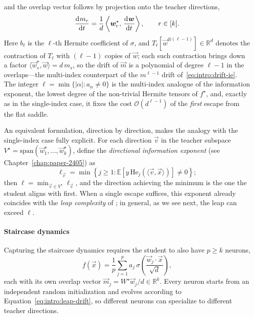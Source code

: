 and the overlap vector follows by projection onto the teacher directions,
\begin{equation}
    \label{eq:intro:leap-drift-overlap}
    \dod{m_r}{t} = \frac{1}{d}\left\langle \vec{w}^\star_r,\, \dod{\vec{w}}{t} \right\rangle, \qquad r \in [k].
\end{equation}
Here \(b_\ell\) is the \(\ell\)-th Hermite coefficient of \(\sigma\), and \(T_\ell[\vec{w}^{\otimes(\ell-1)}] \in \mathbb{R}^d\) denotes the contraction of \(T_\ell\) with \((\ell-1)\) copies of \(\vec{w}\); each such contraction brings down a factor \(\langle \vec{w}^\star_s, \vec{w}\rangle = d\,m_s\), so the drift of \(\vec{m}\) is a polynomial of degree \(\ell-1\) in the overlaps---the multi-index counterpart of the \(m^{\ell-1}\) drift of~\eqref{eq:intro:drift-ie}. The integer \(\ell = \min\{|\alpha| : a_\alpha \neq 0\}\) is the multi-index analogue of the information exponent, the lowest degree of the non-trivial Hermite tensors of \(f^\star\), and, exactly as in the single-index case, it fixes the cost \(\mathcal{O}(d^{\ell-1})\) of the \emph{first} escape from the flat saddle.

An equivalent formulation, direction by direction, makes the analogy with the single-index case fully explicit. For each direction \(\vec{v}\) in the teacher subspace \(V^\star = \mathrm{span}(\vec{w}^\star_1,\ldots,\vec{w}^\star_k)\), define the \emph{directional information exponent} (see Chapter~\ref{chap:paper-2405}) as
\begin{equation}
    \label{eq:intro:dir-info-exponent}
    \ell_{\vec{v}} = \min\!\left\{j \geq 1 : \mathbb{E}\!\left[y\,\mathrm{He}_j\!\left(\langle \vec{v}, \vec{x}\rangle\right)\right] \neq 0\right\};
\end{equation}
then \(\ell = \min_{\vec{v} \in V^\star} \ell_{\vec{v}}\), and the direction achieving the minimum is the one the student aligns with first. When a single escape suffices, this exponent already coincides with the \emph{leap complexity} of \citet{abbe2022merged, abbe2023sgd}; in general, as we see next, the leap can exceed \(\ell\).

\paragraph{Staircase dynamics} Capturing the staircase dynamics requires the student to also have \(p \geq k\) neurons,
\begin{equation}
    \label{eq:intro:multi-neuron-student}
    f(\vec{x}) = \frac{1}{p}\sum_{j=1}^p a_j\,\sigma\!\left(\frac{\vec{w}_j \cdot \vec{x}}{\sqrt{d}}\right),
\end{equation}
each with its own overlap vector \(\vec{m}_j = W^\star\vec{w}_j/d \in \mathbb{R}^k\). Every neuron starts from an independent random initialization and evolves according to Equation~\eqref{eq:intro:leap-drift}, so different neurons can specialize to different teacher directions.

